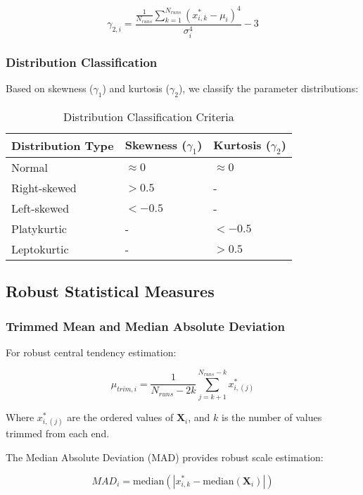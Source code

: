 \documentclass[../main.tex]{subfiles}
\begin{document}
\begin{equation}
\gamma_{2,i} = \frac{\frac{1}{N_{runs}} \sum_{k=1}^{N_{runs}} (x_{i,k}^* - \mu_i)^4}{\sigma_i^4} - 3
\label{eq:kurtosis}
\end{equation}

\subsubsection{Distribution Classification}

Based on skewness ($\gamma_1$) and kurtosis ($\gamma_2$), we classify the parameter distributions:

\begin{table}[H]
\centering
\caption{Distribution Classification Criteria}
\begin{tabular}{@{}lll@{}}
\toprule
Distribution Type & Skewness ($\gamma_1$) & Kurtosis ($\gamma_2$) \\
\midrule
Normal & $\approx 0$ & $\approx 0$ \\
Right-skewed & $> 0.5$ & - \\
Left-skewed & $< -0.5$ & - \\
Platykurtic & - & $< -0.5$ \\
Leptokurtic & - & $> 0.5$ \\
\bottomrule
\end{tabular}
\end{table}

\subsection{Robust Statistical Measures}

\subsubsection{Trimmed Mean and Median Absolute Deviation}

For robust central tendency estimation:

\begin{equation}
\mu_{trim,i} = \frac{1}{N_{runs} - 2k} \sum_{j=k+1}^{N_{runs}-k} x_{i,(j)}^*
\label{eq:trimmed_mean}
\end{equation}

Where $x_{i,(j)}^*$ are the ordered values of $\mathbf{X}_i$, and $k$ is the number of values trimmed from each end.

The Median Absolute Deviation (MAD) provides robust scale estimation:

\begin{equation}
MAD_i = \text{median}(|x_{i,k}^* - \text{median}(\mathbf{X}_i)|)
\label{eq:mad}
\end{equation}
\end{document}
